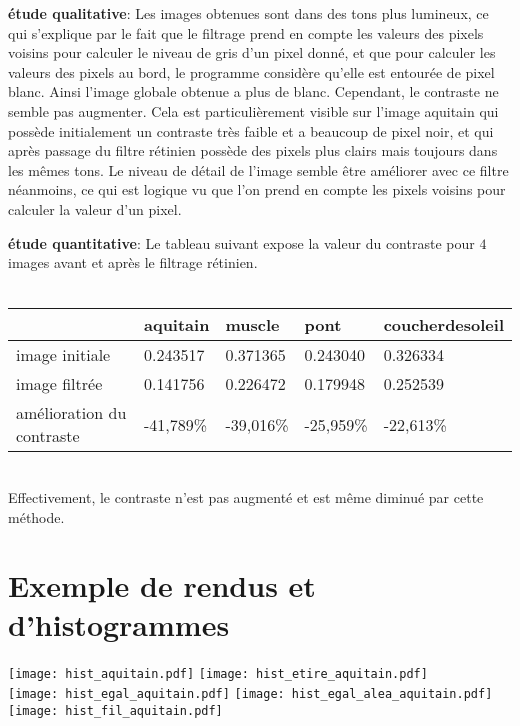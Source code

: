 \documentclass[12pt]{article}
\numberwithin{equation}{section}
\begin{document}
\textbf{étude qualitative}: Les images obtenues sont dans des tons plus lumineux, ce qui s'explique par le fait que le filtrage prend en compte les valeurs des pixels voisins pour calculer le niveau de gris d'un pixel donné, et que pour calculer les valeurs des pixels au bord, le programme considère qu'elle est entourée de pixel blanc. Ainsi l'image globale obtenue a plus de blanc. Cependant, le contraste ne semble pas augmenter. Cela est particulièrement visible sur l'image aquitain qui possède initialement un contraste très faible et a beaucoup de pixel noir, et qui après passage du filtre rétinien possède des pixels plus clairs mais toujours dans les mêmes tons. Le niveau de détail de l'image semble être améliorer avec ce filtre néanmoins, ce qui est logique vu que l'on prend en compte les pixels voisins pour calculer la valeur d'un pixel.

\textbf{étude quantitative}: Le tableau suivant expose la valeur du contraste pour $4$ images avant et après le filtrage rétinien.\\\\
\begin{center}
  \begin{tabular}{|l|l|l|l|l|}
    \hline
    & aquitain & muscle & pont & coucherdesoleil\\
    \hline
    image initiale & 0.243517 & 0.371365 & 0.243040 & 0.326334\\
    \hline
    image filtrée & 0.141756 & 0.226472 & 0.179948 & 0.252539 \\
    \hline
    amélioration du contraste & -41,789\% & -39,016\% & -25,959\% &  -22,613\%\\
    \hline
  \end{tabular}
\end{center}
\\
Effectivement, le contraste n'est pas augmenté et est même diminué par cette méthode.

\section{Exemple de rendus et d'histogrammes}
\texttt{[image: hist\_aquitain.pdf]}
\texttt{[image: hist\_etire\_aquitain.pdf]}
\\
\texttt{[image: hist\_egal\_aquitain.pdf]}
\texttt{[image: hist\_egal\_alea\_aquitain.pdf]}
\\
\texttt{[image: hist\_fil\_aquitain.pdf]}
\end{document}
